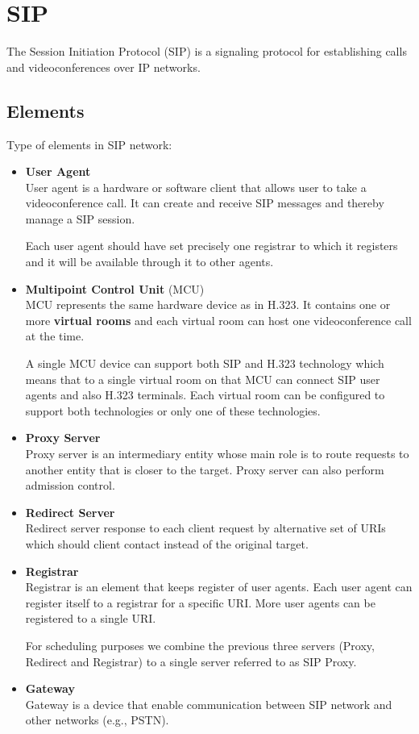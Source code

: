 \documentclass[a4paper]{report}
\begin{document}
\section{SIP}

The Session Initiation Protocol (SIP) is a signaling protocol for establishing calls and videoconferences over IP networks.

\subsection{Elements}

Type of elements in SIP network:

\begin{itemize}
\item \textbf{User Agent} \\
User agent is a hardware or software client that allows user to take a 
videoconference call. It can create and receive SIP messages and thereby
manage a SIP session.

Each user agent should have set precisely one registrar to which it registers and it will be available through it to other agents.

\item \textbf{Multipoint Control Unit} (MCU) \\
MCU represents the same hardware device as in H.323. It contains one or more \textbf{virtual rooms} and each virtual room can host one videoconference call at the time.

A single MCU device can support both SIP and H.323 technology which means that to a single virtual room on that MCU can connect SIP user agents and also H.323 terminals. Each virtual room can be configured to support both technologies or only one of these technologies.

\item \textbf{Proxy Server} \\
Proxy server is an intermediary entity whose main role is to route requests to another entity that is closer to the target. Proxy server can also perform admission control.

\item \textbf{Redirect Server} \\
Redirect server response to each client request by alternative set of URIs which should client contact instead of the original target.

\item \textbf{Registrar} \\
Registrar is an element that keeps register of user agents. Each user agent can register itself to a registrar for a specific URI. More user agents can be registered to a single URI. 

For scheduling purposes we combine the previous three servers (Proxy, Redirect and Registrar) to a single server referred to as SIP Proxy.

\item \textbf{Gateway} \\
Gateway is a device that enable communication between SIP network and other networks (e.g., PSTN).
\end{itemize}
\end{document}
